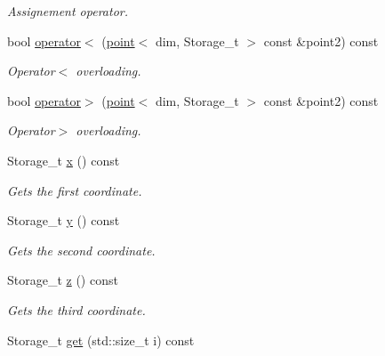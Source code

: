 \begin{DoxyCompactItemize}
\begin{DoxyCompactList}\small\item\em Assignement operator. \item\end{DoxyCompactList}\item 
bool \hyperlink{classpoint_a0debd4bc2cf38b82fd14ebe15f142a9c}{operator$<$} (\hyperlink{classpoint}{point}$<$ dim, Storage\_\-t $>$ const \&point2) const 
\begin{DoxyCompactList}\small\item\em Operator$<$ overloading. \item\end{DoxyCompactList}\item 
bool \hyperlink{classpoint_a8baf3445a84302a9f290ff6c71648ced}{operator$>$} (\hyperlink{classpoint}{point}$<$ dim, Storage\_\-t $>$ const \&point2) const 
\begin{DoxyCompactList}\small\item\em Operator$>$ overloading. \item\end{DoxyCompactList}\item 
\hypertarget{classpoint_a161efef7e37b857fe2e3d611b7162e73}{
Storage\_\-t \hyperlink{classpoint_a161efef7e37b857fe2e3d611b7162e73}{x} () const }
\label{classpoint_a161efef7e37b857fe2e3d611b7162e73}

\begin{DoxyCompactList}\small\item\em Gets the first coordinate. \item\end{DoxyCompactList}\item 
\hypertarget{classpoint_af1ada06a70921219470c90bedffed1ae}{
Storage\_\-t \hyperlink{classpoint_af1ada06a70921219470c90bedffed1ae}{y} () const }
\label{classpoint_af1ada06a70921219470c90bedffed1ae}

\begin{DoxyCompactList}\small\item\em Gets the second coordinate. \item\end{DoxyCompactList}\item 
\hypertarget{classpoint_ac93caee7267fcf940818d2dbdc81a642}{
Storage\_\-t \hyperlink{classpoint_ac93caee7267fcf940818d2dbdc81a642}{z} () const }
\label{classpoint_ac93caee7267fcf940818d2dbdc81a642}

\begin{DoxyCompactList}\small\item\em Gets the third coordinate. \item\end{DoxyCompactList}\item 
\hypertarget{classpoint_a12902b2e7d0bb663a70d26575f0bc7b5}{
Storage\_\-t \hyperlink{classpoint_a12902b2e7d0bb663a70d26575f0bc7b5}{get} (std::size\_\-t i) const }
\label{classpoint_a12902b2e7d0bb663a70d26575f0bc7b5}


\end{DoxyCompactItemize}
